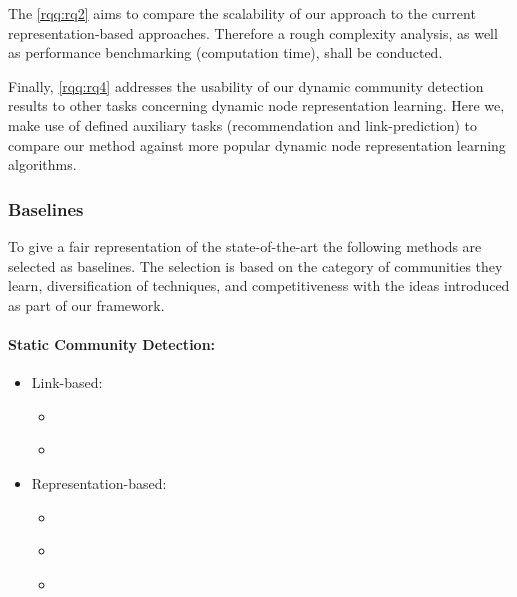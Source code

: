 \documentclass[
acmsmall,
nonacm,
screen,
acmthm]{acmart}
\providecommand{\tightlist}{%
\setlength{\itemsep}{0pt}\setlength{\parskip}{0pt}}
\begin{document}
The \cref{rqq:rq2} aims to compare the scalability of our approach to
the current representation-based approaches. Therefore a rough
complexity analysis, as well as performance benchmarking (computation
time), shall be conducted.

Finally, \cref{rqq:rq4} addresses the usability of our dynamic community
detection results to other tasks concerning dynamic node representation
learning. Here we, make use of defined auxiliary tasks (recommendation
and link-prediction) to compare our method against more popular dynamic
node representation learning algorithms.

\hypertarget{baselines}{%
\subsubsection{Baselines}\label{baselines}}

To give a fair representation of the state-of-the-art the following
methods are selected as baselines. The selection is based on the
category of communities they learn, diversification of techniques, and
competitiveness with the ideas introduced as part of our framework.

\hypertarget{static-community-detection}{%
\paragraph{Static Community
Detection:}\label{static-community-detection}}

\begin{itemize}
\tightlist
\item
  Link-based:

  \begin{itemize}
  \tightlist
  \item
    \citet{heFastAlgorithmCommunity2015}
  \item
    \citet{rossettiANGELEfficientEffective2020}
  \end{itemize}
\item
  Representation-based:

  \begin{itemize}
  \tightlist
  \item
    \citet{rozemberczkiGEMSECGraphEmbedding2019}~~~~
  \item
    \citet{cavallariLearningCommunityEmbedding2017}
  \item
    \citet{jiaCommunityGANCommunityDetection2019}
  \end{itemize}
\end{itemize}
\end{document}
